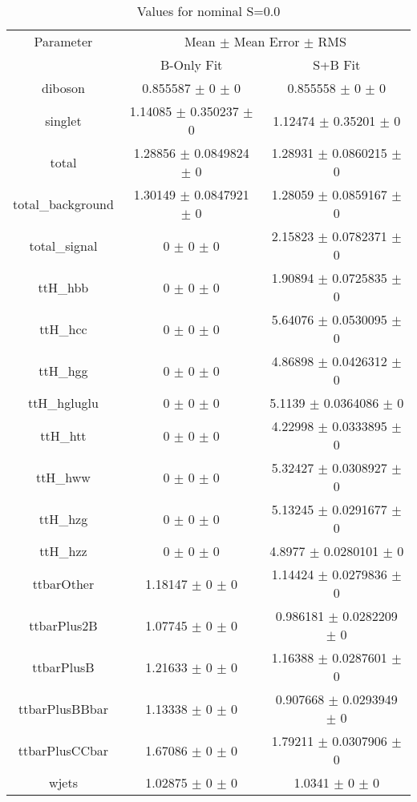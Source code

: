 \begin{table}
\centering
\caption{Values for nominal S=0.0}
\begin{tabular}{ccc}
\toprule
Parameter & \multicolumn{2}{c}{Mean $\pm$ Mean Error $\pm$ RMS}\\
 & B-Only Fit & S+B Fit\\
\midrule
diboson & \num{0.855587} $\pm$ \num{0} $\pm$ \num{0} & \num{0.855558} $\pm$ \num{0} $\pm$ \num{0}\\
singlet & \num{1.14085} $\pm$ \num{0.350237} $\pm$ \num{0} & \num{1.12474} $\pm$ \num{0.35201} $\pm$ \num{0}\\
total & \num{1.28856} $\pm$ \num{0.0849824} $\pm$ \num{0} & \num{1.28931} $\pm$ \num{0.0860215} $\pm$ \num{0}\\
total\_background & \num{1.30149} $\pm$ \num{0.0847921} $\pm$ \num{0} & \num{1.28059} $\pm$ \num{0.0859167} $\pm$ \num{0}\\
total\_signal & \num{0} $\pm$ \num{0} $\pm$ \num{0} & \num{2.15823} $\pm$ \num{0.0782371} $\pm$ \num{0}\\
ttH\_hbb & \num{0} $\pm$ \num{0} $\pm$ \num{0} & \num{1.90894} $\pm$ \num{0.0725835} $\pm$ \num{0}\\
ttH\_hcc & \num{0} $\pm$ \num{0} $\pm$ \num{0} & \num{5.64076} $\pm$ \num{0.0530095} $\pm$ \num{0}\\
ttH\_hgg & \num{0} $\pm$ \num{0} $\pm$ \num{0} & \num{4.86898} $\pm$ \num{0.0426312} $\pm$ \num{0}\\
ttH\_hgluglu & \num{0} $\pm$ \num{0} $\pm$ \num{0} & \num{5.1139} $\pm$ \num{0.0364086} $\pm$ \num{0}\\
ttH\_htt & \num{0} $\pm$ \num{0} $\pm$ \num{0} & \num{4.22998} $\pm$ \num{0.0333895} $\pm$ \num{0}\\
ttH\_hww & \num{0} $\pm$ \num{0} $\pm$ \num{0} & \num{5.32427} $\pm$ \num{0.0308927} $\pm$ \num{0}\\
ttH\_hzg & \num{0} $\pm$ \num{0} $\pm$ \num{0} & \num{5.13245} $\pm$ \num{0.0291677} $\pm$ \num{0}\\
ttH\_hzz & \num{0} $\pm$ \num{0} $\pm$ \num{0} & \num{4.8977} $\pm$ \num{0.0280101} $\pm$ \num{0}\\
ttbarOther & \num{1.18147} $\pm$ \num{0} $\pm$ \num{0} & \num{1.14424} $\pm$ \num{0.0279836} $\pm$ \num{0}\\
ttbarPlus2B & \num{1.07745} $\pm$ \num{0} $\pm$ \num{0} & \num{0.986181} $\pm$ \num{0.0282209} $\pm$ \num{0}\\
ttbarPlusB & \num{1.21633} $\pm$ \num{0} $\pm$ \num{0} & \num{1.16388} $\pm$ \num{0.0287601} $\pm$ \num{0}\\
ttbarPlusBBbar & \num{1.13338} $\pm$ \num{0} $\pm$ \num{0} & \num{0.907668} $\pm$ \num{0.0293949} $\pm$ \num{0}\\
ttbarPlusCCbar & \num{1.67086} $\pm$ \num{0} $\pm$ \num{0} & \num{1.79211} $\pm$ \num{0.0307906} $\pm$ \num{0}\\
wjets & \num{1.02875} $\pm$ \num{0} $\pm$ \num{0} & \num{1.0341} $\pm$ \num{0} $\pm$ \num{0}\\
\bottomrule
\end{tabular}
\end{table}